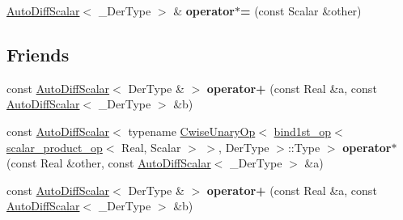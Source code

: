 \begin{DoxyCompactItemize}
\item 
\mbox{\label{struct_eigen_1_1internal_1_1auto__diff__special__op_3_01___der_type_00_01true_01_4_a54617d6be642c17f1bd3837f3ae81b7d}} 
\hyperlink{class_eigen_1_1_auto_diff_scalar}{Auto\+Diff\+Scalar}$<$ \+\_\+\+Der\+Type $>$ \& {\bfseries operator$\ast$=} (const Scalar \&other)
\end{DoxyCompactItemize}
\subsection*{Friends}
\begin{DoxyCompactItemize}
\item 
\mbox{\label{struct_eigen_1_1internal_1_1auto__diff__special__op_3_01___der_type_00_01true_01_4_a1a89be7cf6755b7f410d4be2dd458e5d}} 
const \hyperlink{class_eigen_1_1_auto_diff_scalar}{Auto\+Diff\+Scalar}$<$ Der\+Type \& $>$ {\bfseries operator+} (const Real \&a, const \hyperlink{class_eigen_1_1_auto_diff_scalar}{Auto\+Diff\+Scalar}$<$ \+\_\+\+Der\+Type $>$ \&b)
\item 
\mbox{\label{struct_eigen_1_1internal_1_1auto__diff__special__op_3_01___der_type_00_01true_01_4_a9c9bcf4a0134ce5840b826c0cf8a574a}} 
const \hyperlink{class_eigen_1_1_auto_diff_scalar}{Auto\+Diff\+Scalar}$<$ typename \hyperlink{group___core___module_class_eigen_1_1_cwise_unary_op}{Cwise\+Unary\+Op}$<$ \hyperlink{struct_eigen_1_1internal_1_1bind1st__op}{bind1st\+\_\+op}$<$ \hyperlink{struct_eigen_1_1internal_1_1scalar__product__op}{scalar\+\_\+product\+\_\+op}$<$ Real, Scalar $>$ $>$, Der\+Type $>$\+::Type $>$ {\bfseries operator$\ast$} (const Real \&other, const \hyperlink{class_eigen_1_1_auto_diff_scalar}{Auto\+Diff\+Scalar}$<$ \+\_\+\+Der\+Type $>$ \&a)
\item 
\mbox{\label{struct_eigen_1_1internal_1_1auto__diff__special__op_3_01___der_type_00_01true_01_4_a1a89be7cf6755b7f410d4be2dd458e5d}} 
const \hyperlink{class_eigen_1_1_auto_diff_scalar}{Auto\+Diff\+Scalar}$<$ Der\+Type \& $>$ {\bfseries operator+} (const Real \&a, const \hyperlink{class_eigen_1_1_auto_diff_scalar}{Auto\+Diff\+Scalar}$<$ \+\_\+\+Der\+Type $>$ \&b)

\end{DoxyCompactItemize}
